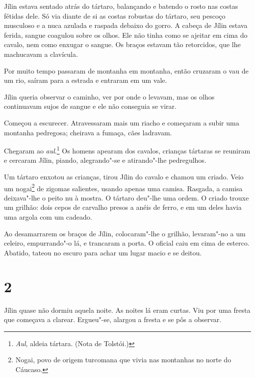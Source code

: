 Jílin estava sentado atrás do tártaro, balançando e batendo o rosto nas
costas fétidas dele. Só via diante de si as costas robustas do tártaro,
seu pescoço musculoso e a nuca azulada e raspada debaixo do gorro. A
cabeça de Jílin estava ferida, sangue coagulou sobre os olhos. Ele não
tinha como se ajeitar em cima do cavalo, nem como enxugar o sangue. Os
braços estavam tão retorcidos, que lhe machucavam a clavícula.

Por muito tempo passaram de montanha em montanha, então cruzaram o vau
de um rio, saíram para a estrada e entraram em um vale.

Jílin queria observar o caminho, ver por onde o levavam, mas os olhos
continuavam sujos de sangue e ele não conseguia se virar.

Começou a escurecer. Atravessaram mais um riacho e começaram a subir uma
montanha pedregosa; cheirava a fumaça, cães ladravam.

Chegaram ao \emph{aul}.\footnote{\emph{Aul}, aldeia tártara.
  (Nota de Tolstói.)} Os homens apearam dos cavalos, crianças tártaras
se reuniram e cercaram Jílin, piando, alegrando"-se e atirando"-lhe
pedregulhos.

Um tártaro enxotou as crianças, tirou Jílin do cavalo e chamou um
criado. Veio um nogai\footnote{Nogai, povo de origem turcomana que
  vivia nas montanhas no norte do Cáucaso.} de zigomas salientes, usando
apenas uma camisa. Rasgada, a camisa deixava"-lhe o peito nu à mostra. O
tártaro deu"-lhe uma ordem. O criado trouxe um grilhão: dois cepos de
carvalho presos a anéis de ferro, e em um deles havia uma argola com um
cadeado.

Ao desamarrarem os braços de Jílin, colocaram"-lhe o grilhão, levaram"-no
a um celeiro, empurrando"-o lá, e trancaram a porta. O oficial caiu em
cima de esterco. Abatido, tateou no escuro para achar um lugar macio e
se deitou.

\section{2}

Jílin quase não dormiu aquela noite. As noites lá eram curtas. Viu por
uma fresta que começava a clarear. Ergueu"-se, alargou a fresta e se pôs
a observar.

